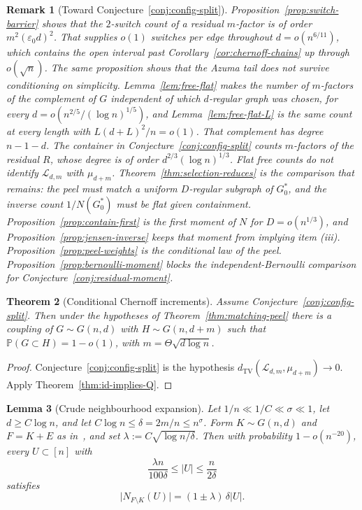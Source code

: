 \documentclass[11pt]{article}
\newtheorem{theorem}{Theorem}
\newtheorem{lemma}[theorem]{Lemma}
\newtheorem{remark}[theorem]{Remark}
\newcommand{\Gnd}{G(n,d)}
\newcommand{\PP}{\mathbb{P}}
\newcommand{\dTV}{d_{\mathrm{TV}}}
\begin{document}
\begin{remark}[Toward Conjecture~\ref{conj:config-split}]
\label{rem:config-split}
Proposition~\ref{prop:switch-barrier} shows that the \(2\)-switch count of a residual
\(m\)-factor is of order \(m^2(\varepsilon_0 d)^2\). That supplies \(o(1)\) switches per
edge throughout \(d=o(n^{6/11})\), which contains the open interval past
Corollary~\ref{cor:chernoff-chains} up through \(o(\sqrt{n})\). The same proposition
shows that the Azuma tail does not survive conditioning on simplicity.
Lemma~\ref{lem:free-flat} makes the number of \(m\)-factors of the complement of \(G\)
independent of which \(d\)-regular graph was chosen, for every
\(d=o(n^{2/5}/(\log n)^{1/5})\), and Lemma~\ref{lem:free-flat-L} is the same count at every length with \(L(d+L)^2/n=o(1)\).
That complement has degree \(n-1-d\). The container in
Conjecture~\ref{conj:config-split} counts \(m\)-factors of the residual \(R\), whose
degree is of order \(d^{2/3}(\log n)^{1/3}\). Flat free counts do not identify
\(\mathcal{L}_{d,m}\) with \(\mu_{d+m}\).
Theorem~\ref{thm:selection-reduces} is the comparison that remains: the peel must match a uniform \(D\)-regular subgraph of \(G^*_0\), and the inverse count \(1/N(G^*_0)\) must be flat given containment.
Proposition~\ref{prop:contain-first} is the first moment of \(N\) for \(D=o(n^{1/3})\), and Proposition~\ref{prop:jensen-inverse} keeps that moment from implying item (iii).
Proposition~\ref{prop:peel-weights} is the conditional law of the peel.
Proposition~\ref{prop:bernoulli-moment} blocks the independent-Bernoulli comparison for Conjecture~\ref{conj:residual-moment}.
\end{remark}

\begin{theorem}[Conditional Chernoff increments]
\label{thm:conditional-chernoff-inc}
Assume Conjecture~\ref{conj:config-split}.
Then under the hypotheses of Theorem~\ref{thm:matching-peel} there is a coupling of
\(G\sim\Gnd\) with \(H\sim G(n,d+m)\) such that \(\PP(G\subset H)=1-o(1)\), with
\(m=\Theta\sqrt{d\log n}\).
\end{theorem}

\begin{proof}
Conjecture~\ref{conj:config-split} is the hypothesis
\(\dTV(\mathcal{L}_{d,m},\mu_{d+m})\to 0\).
Apply Theorem~\ref{thm:id-implies-Q}.
\end{proof}

\begin{lemma}[Crude neighbourhood expansion]
\label{lem:crude-exp}
Let \(1/n\ll 1/C\ll\sigma\ll 1\), let \(d\ge C\log n\), and let
\(C\log n\le\delta=2m/n\le n^{\sigma}\).
Form \(K\sim G(n,d)\) and \(F=K+E\) as in~\cite[Lemma~6.15]{BIM25}, and set
\(\lambda:=C\sqrt{\log n/\delta}\).
Then with probability \(1-o(n^{-20})\), every \(U\subset[n]\) with
\[
\frac{\lambda n}{100\delta}\le|U|\le\frac{n}{2\delta}
\]
satisfies
\[
\bigl|N_{F\setminus K}(U)\bigr|
=(1\pm\lambda)\,\delta|U|.
\]
\end{lemma}
\end{document}
